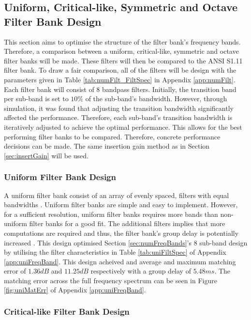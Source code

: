 \documentclass[12pt, onecolumn]{article}
\begin{document}
\subsection{Uniform, Critical-like, Symmetric and Octave Filter Bank Design}
\label{sec:uniCritSymOct}

\noindent This section aims to optimise the structure of the filter bank's frequency bands. Therefore, a comparison between a uniform, critical-like, symmetric and octave filter banks will be made. These filters will then be compared to the ANSI S1.11 filter bank. To draw a fair comparison, all of the filters will be design with the parameters given in Table \ref{tab:numFilt_FiltSpec} in Appendix \ref{app:numFilt}. Each filter bank will consist of $8$ bandpass filters. Initially, the transition band per sub-band is set to $10\%$ of the sub-band's bandwidth. However, through simulation, it was found that adjusting the transition bandwidth significantly affected the performance. Therefore, each sub-band's transition bandwidth is iteratively adjusted to achieve the optimal performance. This allows for the best performing filter banks to be compared. Therefore, concrete performance decisions can be made. The same insertion gain method as in Section \ref{sec:insertGain} will be used.

\subsubsection{Uniform Filter Bank Design}
\label{sec:uniDesign}

\noindent A uniform filter bank consist of an array of evenly spaced, filters with equal bandwidths \cite{chang}. Uniform filter banks are simple and easy to implement. However, for a sufficient resolution, uniform filter banks requires more bands than non-uniform filter banks for a good fit. The additional filters implies that more computations are required and thus, the filter bank's group delay is potentially increased \cite{brennan}. This design optimised  Section \ref{sec:numFreqBands}'s $8$ sub-band design by utilising the filter characteristics in Table \ref{tab:uniFiltSpec} of Appendix \ref{app:uniFreqBand}. This design acheived and average and maximum matching error of $1.36dB$ and $11.25dB$ respectively with a group delay of $5.48ms$. The matching error across the full frequency spectrum can be seen in Figure \ref{fig:uniMatErr} of Appendix \ref{app:uniFreqBand}.


\subsubsection{Critical-like Filter Bank Design}
\label{sec:critDesign}
\end{document}
